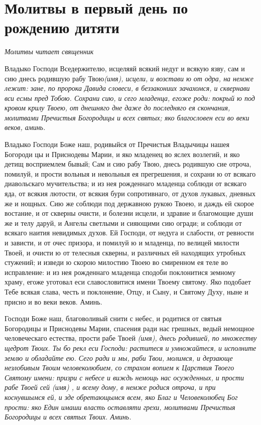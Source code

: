 \section{Молитвы в первый день по рождению дитяти}\begin{mymulticols}



\itshape Молитвы читает священник\normalfont{}

Владыко Господи Вседержителю, исцеляяй всякий недуг и всякую язву, сам и сию днесь родившую рабу Твою\itshape  (имя)\normalfont{}, исцели, и возстави ю от одра, на немже лежит: зане, по пророка Давида словеси, в беззакониих зачахомся, и сквернави вси есмы пред Тобою. Сохрани сию, и сего младенца, егоже роди: покрый ю под кровом крилу Твоею, от днешняго дне даже до последняго ея скончания, молитвами Пречистыя Богородицы и всех святых; яко благословен еси во веки веков, аминь.


Владыко Господи Боже наш, родивыйся от Пречистыя Владычицы нашея Богороди цы и Приснодевы Марии, и яко младенец во яслех возлегий, и яко детищ восприемлем бывый; Сам и сию рабу Твою, днесь родившую сие отроча, помилуй, и прости вольныя и невольныя ея прегрешения, и сохрани ю от всякаго диавольскаго мучительства; и из нея рожденнаго младенца соблюди от всякаго яда, от всякия лютости, от всякия бури сопротивнаго, от духов лукавых, дневных же и нощных. Сию же соблюди под державною рукою Твоею, и даждь ей скорое востание, и от скверны очисти, и болезни исцели, и здравие и благомощие души же и телу даруй, и Ангелы светлыми и сияющими сию огради; и соблюди от всякаго наития невидимых духов. Ей Господи, от недуга и слабости, от ревности и зависти, и от очес призора, и помилуй ю и младенца, по велицей милости Твоей, и очисти ю от телесныя скверны, и различных ей находящих утробных стужений; и изведи ю скорою милостию Твоею во смиренном ея теле во исправление: и из нея рожденнаго младенца сподоби поклонитися земному храму, егоже уготовал еси славословитися имени Твоему святому. Яко подобает Тебе всякая слава, честь и поклонение, Отцу, и Сыну, и Святому Духу, ныне и присно и во веки веков. Аминь.


Господи Боже наш, благоволивый снити с небес, и родитися от святыя Богородицы и Приснодевы Марии, спасения ради нас грешных, ведый немощное человеческаго естества, прости рабе Твоей \itshape (имя)\normalfont{}, днесь родившей, по множеству щедрот Твоих. Ты бо рекл еси Господи: раститеся и умножайтеся, и исполните землю и обладайте ею. Сего ради и мы, раби Твои, молимся, и дерзающе незлобивым Твоим человеколюбием, со страхом вопием к Царствия Твоего Святому имени: призри с небесе и виждь немощь нас осужденных, и прости рабе Твоей сей (\itshape имя\normalfont{}) , и всему дому, в немже родися отроча, и при коснувшымся ей, и зде обретающымся всем, яко Благ и Человеколюбец Бог прости: яко Един имаши власть оставляти грехи, молитвами Пречистыя Богородицы и всех святых Твоих. Аминь.





\end{mymulticols}

